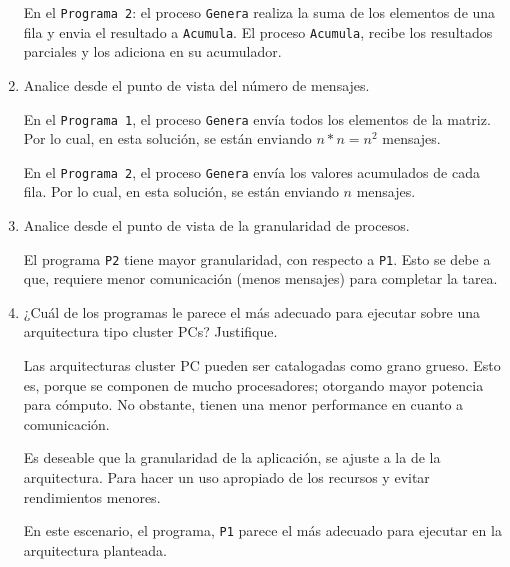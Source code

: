 \documentclass[a4paper, 10pt]{article}
\newenvironment{QandA}{
    \begin{enumerate}\bfseries}
    {\end{enumerate}
}
\newenvironment{answered}{\par\normalfont}{}
\begin{document}
\begin{QandA}
\begin{enumerate}
\begin{answered}
En el \lstinline{Programa 2}: el proceso \lstinline{Genera} realiza la suma de los elementos de una fila y envia el resultado a \lstinline{Acumula}. El proceso \lstinline{Acumula}, recibe los resultados parciales y los adiciona en su acumulador.
\end{answered}


\item Analice desde el punto de vista del número de mensajes.

\begin{answered}
En el \lstinline{Programa 1}, el proceso \lstinline{Genera} envía todos los elementos de la matriz. Por lo cual, en esta solución, se están enviando $n*n = n^2$ mensajes.

En el \lstinline{Programa 2}, el proceso \lstinline{Genera} envía los valores acumulados de cada fila. Por lo cual, en esta solución, se están enviando $n$ mensajes.

\end{answered}

\item Analice desde el punto de vista de la granularidad de procesos.

\begin{answered}
El programa \lstinline{P2} tiene mayor granularidad, con respecto a \lstinline{P1}. Esto se debe a que, requiere menor comunicación (menos mensajes) para completar la tarea.
\end{answered}

\item ¿Cuál de los programas le parece el más adecuado para ejecutar sobre una arquitectura tipo cluster PCs? Justifique. 

\begin{answered}
Las arquitecturas cluster PC pueden ser catalogadas como grano grueso. Esto es, porque se componen de mucho procesadores; otorgando mayor potencia para cómputo. No obstante, tienen una menor performance en cuanto a comunicación.

Es deseable que la granularidad de la aplicación, se ajuste a la de la arquitectura. Para hacer un uso apropiado de los recursos y evitar rendimientos menores.

En este escenario, el programa, \lstinline{P1} parece el más adecuado para ejecutar en la arquitectura planteada.
\end{answered}
\end{enumerate}



\end{QandA}
\end{document}

